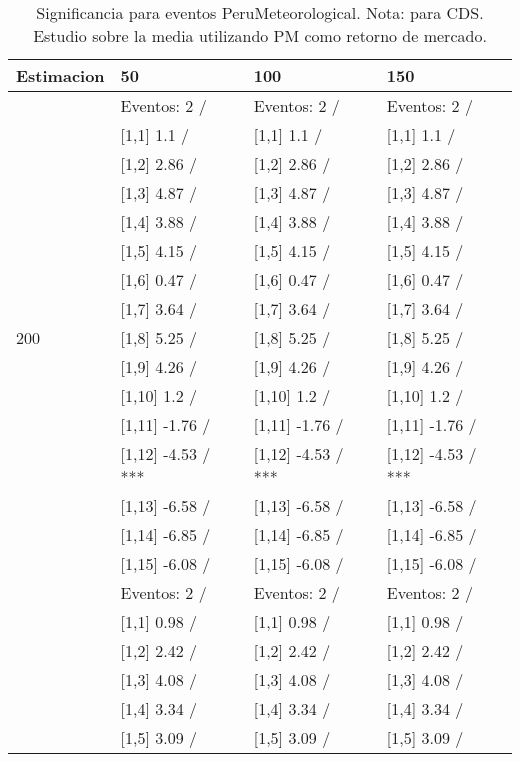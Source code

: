 \begin{table}

\caption{Significancia para eventos PeruMeteorological. Nota: para CDS. Estudio sobre la media utilizando PM como retorno de mercado.}
\centering
\begin{tabular}[t]{llll}
\toprule
Estimacion & 50 & 100 & 150\\
\midrule
 & Eventos:  2 / & Eventos:  2 / & Eventos:  2 /\\
 & {}[1,1] 1.1  / & {}[1,1] 1.1  / & {}[1,1] 1.1  /\\
 & {}[1,2] 2.86  / & {}[1,2] 2.86  / & {}[1,2] 2.86  /\\
 & {}[1,3] 4.87  / & {}[1,3] 4.87  / & {}[1,3] 4.87  /\\
 & {}[1,4] 3.88  / & {}[1,4] 3.88  / & {}[1,4] 3.88  /\\
\addlinespace
 & {}[1,5] 4.15  / & {}[1,5] 4.15  / & {}[1,5] 4.15  /\\
 & {}[1,6] 0.47  / & {}[1,6] 0.47  / & {}[1,6] 0.47  /\\
 & {}[1,7] 3.64  / & {}[1,7] 3.64  / & {}[1,7] 3.64  /\\
200 & {}[1,8] 5.25  / & {}[1,8] 5.25  / & {}[1,8] 5.25  /\\
 & {}[1,9] 4.26  / & {}[1,9] 4.26  / & {}[1,9] 4.26  /\\
\addlinespace
 & {}[1,10] 1.2  / & {}[1,10] 1.2  / & {}[1,10] 1.2  /\\
 & {}[1,11] -1.76  / & {}[1,11] -1.76  / & {}[1,11] -1.76  /\\
 & {}[1,12] -4.53  / *** & {}[1,12] -4.53  / *** & {}[1,12] -4.53  / ***\\
 & {}[1,13] -6.58  / & {}[1,13] -6.58  / & {}[1,13] -6.58  /\\
 & {}[1,14] -6.85  / & {}[1,14] -6.85  / & {}[1,14] -6.85  /\\
\addlinespace
 & {}[1,15] -6.08  / & {}[1,15] -6.08  / & {}[1,15] -6.08  /\\
 & Eventos:  2 / & Eventos:  2 / & Eventos:  2 /\\
 & {}[1,1] 0.98  / & {}[1,1] 0.98  / & {}[1,1] 0.98  /\\
 & {}[1,2] 2.42  / & {}[1,2] 2.42  / & {}[1,2] 2.42  /\\
 & {}[1,3] 4.08  / & {}[1,3] 4.08  / & {}[1,3] 4.08  /\\
\addlinespace
 & {}[1,4] 3.34  / & {}[1,4] 3.34  / & {}[1,4] 3.34  /\\
 & {}[1,5] 3.09  / & {}[1,5] 3.09  / & {}[1,5] 3.09  /\\

\end{tabular}
\end{table}
